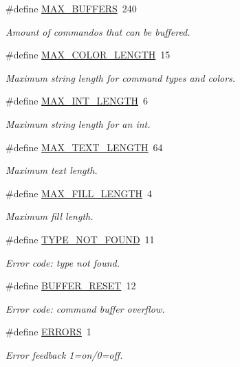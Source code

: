 \begin{DoxyCompactItemize}
\#define \mbox{\hyperlink{group___global_ga7781bc9613ec655352585fb1bac2595d}{M\+A\+X\+\_\+\+B\+U\+F\+F\+E\+RS}}~240
\begin{DoxyCompactList}\small\item\em Amount of commando\textquotesingle{}s that can be buffered. \end{DoxyCompactList}\item 
\#define \mbox{\hyperlink{group___global_ga9db5737c1a3aca5e334701167cae3e00}{M\+A\+X\+\_\+\+C\+O\+L\+O\+R\+\_\+\+L\+E\+N\+G\+TH}}~15
\begin{DoxyCompactList}\small\item\em Maximum string length for command types and colors. \end{DoxyCompactList}\item 
\#define \mbox{\hyperlink{group___global_ga641c7a7b2caa1f47c6663fdc497f226a}{M\+A\+X\+\_\+\+I\+N\+T\+\_\+\+L\+E\+N\+G\+TH}}~6
\begin{DoxyCompactList}\small\item\em Maximum string length for an int. \end{DoxyCompactList}\item 
\#define \mbox{\hyperlink{group___global_ga9a90baeac9b3273d185357200b599b39}{M\+A\+X\+\_\+\+T\+E\+X\+T\+\_\+\+L\+E\+N\+G\+TH}}~64
\begin{DoxyCompactList}\small\item\em Maximum text length. \end{DoxyCompactList}\item 
\#define \mbox{\hyperlink{group___global_ga2543b47347236bd1d0a2428cb40cc321}{M\+A\+X\+\_\+\+F\+I\+L\+L\+\_\+\+L\+E\+N\+G\+TH}}~4
\begin{DoxyCompactList}\small\item\em Maximum fill length. \end{DoxyCompactList}\item 
\#define \mbox{\hyperlink{group___global_ga8b8c687a94603aab4af357a42d0133a9}{T\+Y\+P\+E\+\_\+\+N\+O\+T\+\_\+\+F\+O\+U\+ND}}~11
\begin{DoxyCompactList}\small\item\em Error code\+: type not found. \end{DoxyCompactList}\item 
\#define \mbox{\hyperlink{group___global_ga1e493643f3de3f4dcaddb01b5ed7bd57}{B\+U\+F\+F\+E\+R\+\_\+\+R\+E\+S\+ET}}~12
\begin{DoxyCompactList}\small\item\em Error code\+: command buffer overflow. \end{DoxyCompactList}\item 
\#define \mbox{\hyperlink{group___global_ga99b80bb81818c2dad473f11457a79395}{E\+R\+R\+O\+RS}}~1
\begin{DoxyCompactList}\small\item\em Error feedback 1=on/0=off. \end{DoxyCompactList}\end{DoxyCompactItemize}


